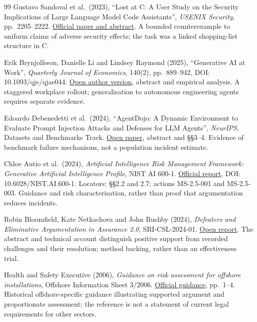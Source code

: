 \documentclass[11pt,a4paper]{article}
\begin{document}
\begin{thebibliography}{99}
Gustavo Sandoval et al.~(2023), ``Lost at C: A User Study on the Security Implications of Large Language Model Code Assistants'', \emph{USENIX Security}, pp.~2205--2222. \href{https://www.usenix.org/conference/usenixsecurity23/presentation/sandoval}{Official paper and abstract}. A bounded counterexample to uniform claims of adverse security effects; the task was a linked shopping-list structure in C.

Erik Brynjolfsson, Danielle Li and Lindsey Raymond (2025), ``Generative AI at Work'', \emph{Quarterly Journal of Economics}, 140(2), pp.~889--942, DOI: 10.1093/qje/qjae044. \href{https://arxiv.org/abs/2304.11771v2}{Open author version}, abstract and empirical analysis. A staggered workplace rollout; generalisation to autonomous engineering agents requires separate evidence.

Edoardo Debenedetti et al.~(2024), ``AgentDojo: A Dynamic Environment to Evaluate Prompt Injection Attacks and Defenses for LLM Agents'', \emph{NeurIPS}, Datasets and Benchmarks Track. \href{https://arxiv.org/abs/2406.13352}{Open paper}, abstract and §§3--4. Evidence of benchmark failure mechanisms, not a population incident estimate.

Chloe Autio et al.~(2024), \emph{Artificial Intelligence Risk Management Framework: Generative Artificial Intelligence Profile}, NIST AI 600-1. \href{https://nvlpubs.nist.gov/nistpubs/ai/NIST.AI.600-1.pdf}{Official report}, DOI: 10.6028/NIST.AI.600-1. Locators: §§2.2 and 2.7; actions MS-2.5-001 and MS-2.5-003. Guidance and risk characterisation, rather than proof that argumentation reduces incidents.

Robin Bloomfield, Kate Netkachova and John Rushby (2024), \emph{Defeaters and Eliminative Argumentation in Assurance 2.0}, SRI-CSL-2024-01. \href{https://arxiv.org/abs/2405.15800}{Open report}. The abstract and technical account distinguish positive support from recorded challenges and their resolution; method backing, rather than an effectiveness trial.

Health and Safety Executive (2006), \emph{Guidance on risk assessment for offshore installations}, Offshore Information Sheet 3/2006. \href{https://www.hse.gov.uk/offshore/assets/docs/sheet32006.pdf}{Official guidance}, pp.~1--4. Historical offshore-specific guidance illustrating supported argument and proportionate assessment; the reference is not a statement of current legal requirements for other sectors.


\end{thebibliography}
\end{document}
